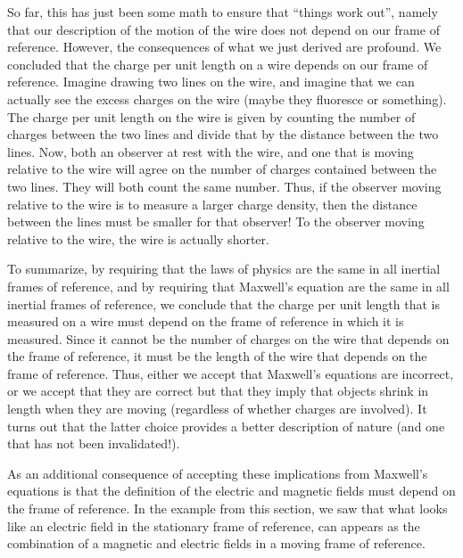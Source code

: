 So far, this has just been some math to ensure that ``things work out'', namely that our description of the motion of the wire does not depend on our frame of reference. However, the consequences of what we just derived are profound. We concluded that the charge per unit length on a wire depends on our frame of reference. Imagine drawing two lines on the wire, and imagine that we can actually see the excess charges on the wire (maybe they fluoresce or something). The charge per unit length on the wire is given by counting the number of charges between the two lines and divide that by the distance between the two lines. Now, both an observer at rest with the wire, and one that is moving relative to the wire will agree on the number of charges contained between the two lines. They will both count the same number. Thus, if the observer moving relative to the wire is to measure a larger charge density, then the distance between the lines must be smaller for that observer! To the observer moving relative to the wire, the wire is actually shorter. 

To summarize, by requiring that the laws of physics are the same in all inertial frames of reference, and by requiring that Maxwell's equation are the same in all inertial frames of reference, we conclude that the charge per unit length that is measured on a wire must depend on the frame of reference in which it is measured. Since it cannot be the number of charges on the wire that depends on the frame of reference, it must be the length of the wire that depends on the frame of reference. Thus, either we accept that Maxwell's equations are incorrect, or we accept that they are correct but that they imply that objects shrink in length when they are moving (regardless of whether charges are involved). It turns out that the latter choice provides a better description of nature (and one that has not been invalidated!). 

As an additional consequence of accepting these implications from Maxwell's equations is that the definition of the electric and magnetic fields must depend on the frame of reference. In the example from this section, we saw that what looks like an electric field in the stationary frame of reference, can appears as the combination of a magnetic and electric fields in a moving frame of reference.

